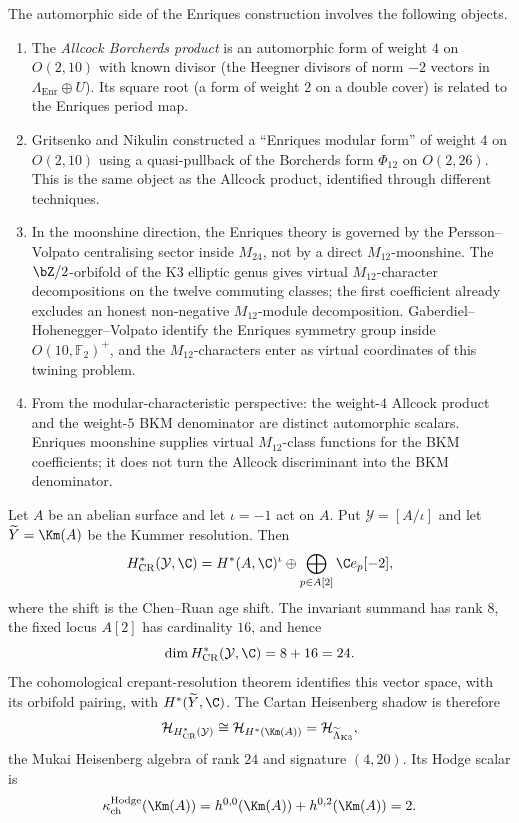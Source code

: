 \begin{remark}
\label{rem:enriques-automorphic}
The automorphic side of the Enriques construction involves the following objects.
\begin{enumerate}[label=\textup{(\arabic*)}]
 \item The \emph{Allcock Borcherds product} is an automorphic form of weight $4$ on $O(2, 10)$ with known divisor (the Heegner divisors of norm $-2$ vectors in $\Lambda_{\mathrm{Enr}} \oplus U$). Its square root (a form of weight $2$ on a double cover) is related to the Enriques period map.
 \item Gritsenko and Nikulin constructed a ``Enriques modular form'' of weight $4$ on $O(2, 10)$ using a quasi-pullback of the Borcherds form $\Phi_{12}$ on $O(2, 26)$. This is the same object as the Allcock product, identified through different techniques.
 \item In the moonshine direction, the Enriques theory is governed by
 the Persson--Volpato centralising sector inside \(M_{24}\), not by a
 direct \(M_{12}\)-moonshine. The \(\bZ/2\)-orbifold of the K3 elliptic
 genus gives virtual \(M_{12}\)-character decompositions on the
 twelve commuting classes; the first coefficient already excludes an
 honest non-negative \(M_{12}\)-module decomposition.
 Gaberdiel--Hohenegger--Volpato identify the Enriques symmetry group
 inside \(O(10,\mathbb F_2)^+\), and the \(M_{12}\)-characters enter as
 virtual coordinates of this twining problem.
 \item From the modular-characteristic perspective: the weight-$4$ Allcock product and the weight-$5$ BKM denominator are distinct automorphic scalars.  Enriques moonshine supplies virtual \(M_{12}\)-class functions for the BKM coefficients; it does not turn the Allcock discriminant into the BKM denominator.
\end{enumerate}
\end{remark}


\begin{proposition}
\label{prop:kummer-orbifold}
Let $A$ be an abelian surface and let $\iota=-1$ act on $A$.  Put
$\mathcal Y=[A/\iota]$ and let $\widetilde Y=\Km(A)$ be the Kummer
resolution.  Then
\[
 H^*_{\mathrm{CR}}(\mathcal Y,\C)
 =
 H^*(A,\C)^{\iota}
 \oplus
 \bigoplus_{p\in A[2]}\C e_p[-2],
\]
where the shift is the Chen--Ruan age shift.  The invariant summand has
rank \(8\), the fixed locus \(A[2]\) has cardinality \(16\), and hence
\[
 \dim H^*_{\mathrm{CR}}(\mathcal Y,\C)=8+16=24.
\]
The cohomological crepant-resolution theorem identifies this vector
space, with its orbifold pairing, with \(H^*(\widetilde Y,\C)\).  The
Cartan Heisenberg shadow is therefore
\[
 \mathcal H_{H^*_{\mathrm{CR}}(\mathcal Y)}
 \cong
 \mathcal H_{H^*(\Km(A))}
 =
 \mathcal H_{\widetilde\Lambda_{\mathrm{K3}}},
\]
the Mukai Heisenberg algebra of rank \(24\) and signature \((4,20)\).
Its Hodge scalar is
\[
 \kappa_{\mathrm{ch}}^{\mathrm{Hodge}}(\Km(A))
 =
 h^{0,0}(\Km(A))+h^{0,2}(\Km(A))
 =
 2.
\]
\end{proposition}

